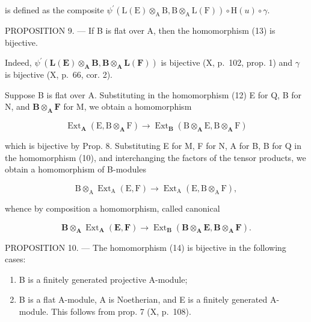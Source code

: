 is defined as the composite \(\psi^{\prime}(\mathrm{L}(\mathrm{E})\otimes_{\mathrm{A}}\mathrm{B},\mathrm{B}\otimes_{\mathrm{A}}\mathrm{L}(\mathrm{F}))\circ \mathrm{H}(u)\circ \gamma .\)

PROPOSITION 9. --- If B is flat over A, then the homomorphism (13) is bijective.

Indeed, \(\psi^{\prime}(\mathbf{L}(\mathbf{E})\otimes_{\mathbf{A}}\mathbf{B},\mathbf{B}\otimes_{\mathbf{A}}\mathbf{L}(\mathbf{F}))\) is bijective (X, p.~102, prop. 1) and \(\gamma\) is bijective (X, p.~66, cor. 2).

Suppose B is flat over A. Substituting in the homomorphism (12) E for Q, B for N, and \(\mathbf{B} \otimes_{\mathbf{A}} \mathbf{F}\) for M, we obtain a homomorphism

\[
\operatorname{Ext} _ {\mathbf {A}} \left(\mathrm{E}, \mathrm{B} \otimes_ {\mathbf {A}} \mathrm{F}\right)\rightarrow \operatorname{Ext} _ {\mathbf {B}} \left(\mathrm{B} \otimes_ {\mathbf {A}} \mathrm{E}, \mathrm{B} \otimes_ {\mathbf {A}} \mathrm{F}\right)
\]

which is bijective by Prop. 8. Substituting E for M, F for N, A for B, B for Q in the homomorphism (10), and interchanging the factors of the tensor products, we obtain a homomorphism of B-modules

\[
\mathrm{B} \otimes_ {\mathrm{A}} \operatorname{Ext} _ {\mathrm{A}} (\mathrm{E}, \mathrm{F}) \rightarrow \operatorname{Ext} _ {\mathrm{A}} (\mathrm{E}, \mathrm{B} \otimes_ {\mathrm{A}} \mathrm{F}),
\]

whence by composition a homomorphism, called canonical

\[
\mathbf {B} \otimes_ {\mathbf {A}} \operatorname{Ext} _ {\mathbf {A}} (\mathbf {E}, \mathbf {F}) \rightarrow \operatorname{Ext} _ {\mathbf {B}} (\mathbf {B} \otimes_ {\mathbf {A}} \mathbf {E}, \mathbf {B} \otimes_ {\mathbf {A}} \mathbf {F}).\tag{14}
\]

PROPOSITION 10. --- The homomorphism (14) is bijective in the following cases:

\begin{enumerate}
\def\labelenumi{\alph{enumi})}
\item
  B is a finitely generated projective A-module;
\item
  B is a flat A-module, A is Noetherian, and E is a finitely generated A-module. This follows from prop. 7 (X, p.~108).
\end{enumerate}

